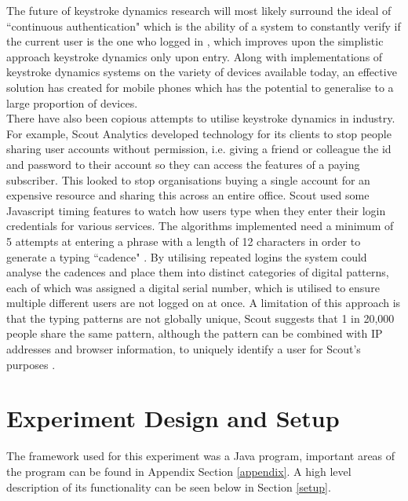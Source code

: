 \documentclass{article}
\begin{document}
The future of keystroke dynamics research will most likely surround the ideal of ``continuous authentication" which is the ability of a system  to constantly verify if the current user is the one who logged in \parencite{sznur2015advances}, which improves upon the simplistic approach keystroke dynamics only upon entry. Along with implementations of keystroke dynamics systems on the variety of devices available today, an effective solution has created for mobile phones \parencite{maiorana2011keystroke} which has the potential to generalise to a large proportion of devices. \\ 

There have also been copious attempts to utilise keystroke dynamics in industry. For example, Scout Analytics developed technology for its clients to stop people sharing user accounts without permission, i.e. giving a friend or colleague the id and password to their account so they can access the features of a paying subscriber. This looked to stop organisations buying a single account for an expensive resource and sharing this across an entire office. Scout used some Javascript timing features to watch how users type when they enter their login credentials for various services. The algorithms implemented need a minimum of 5 attempts at entering a phrase with a length of 12 characters in order to generate a typing ``cadence" \parencite{arsTech}. By utilising repeated logins the system could analyse the cadences and place them into distinct categories of digital patterns, each of which was assigned a digital serial number, which is utilised to ensure multiple different users are not logged on at once. A limitation of this approach is that the typing patterns are not globally unique, Scout suggests that 1 in 20,000 people share the same pattern, although the pattern can be combined with IP addresses and browser information, to uniquely identify a user for Scout's purposes \parencite{arsTech}. 

\section{Experiment Design and Setup} \label{experiment}
The framework used for this experiment was a Java program, important areas of the program can be found in Appendix Section \ref{appendix}. A high level description of its functionality can be seen below in Section \ref{setup}. \\
\end{document}
